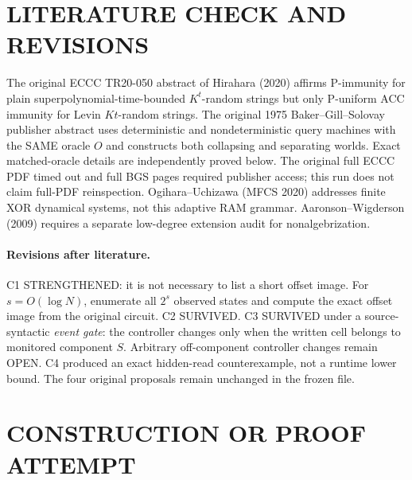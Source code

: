 \documentclass[11pt]{article}
\begin{document}
\section{LITERATURE CHECK AND REVISIONS}
The original ECCC TR20-050 abstract of Hirahara (2020) affirms P-immunity for plain superpolynomial-time-bounded $K^t$-random strings but only P-uniform ACC immunity for Levin $Kt$-random strings. The original 1975 Baker--Gill--Solovay publisher abstract uses deterministic and nondeterministic query machines with the SAME oracle $O$ and constructs both collapsing and separating worlds. Exact matched-oracle details are independently proved below. The original full ECCC PDF timed out and full BGS pages required publisher access; this run does not claim full-PDF reinspection. Ogihara--Uchizawa (MFCS 2020) addresses finite XOR dynamical systems, not this adaptive RAM grammar. Aaronson--Wigderson (2009) requires a separate low-degree extension audit for nonalgebrization.
\paragraph{Revisions after literature.} C1 STRENGTHENED: it is not necessary to list a short offset image. For $s=O(\log N)$, enumerate all $2^s$ observed states and compute the exact offset image from the original circuit. C2 SURVIVED. C3 SURVIVED under a source-syntactic \emph{event gate}: the controller changes only when the written cell belongs to monitored component $S$. Arbitrary off-component controller changes remain OPEN. C4 produced an exact hidden-read counterexample, not a runtime lower bound. The four original proposals remain unchanged in the frozen file.
\section{CONSTRUCTION OR PROOF ATTEMPT}
\end{document}
